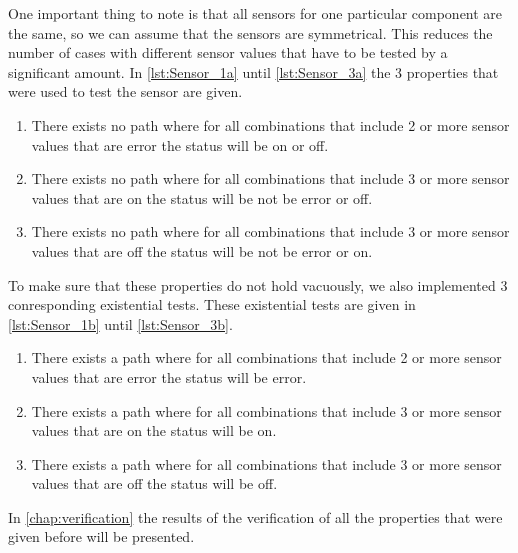 	One important thing to note is that all sensors for one particular component are the same, so we can assume that the sensors are symmetrical.
	This reduces the number of cases with different sensor values that have to be tested by a significant amount.
	In \cref{lst:Sensor_1a} until \cref{lst:Sensor_3a} the 3 properties that were used to test the sensor are given.
	
	\begin{enumerate}
		\item There exists no path where for all combinations that include 2 or more sensor values that are error the status will be on or off. 
		
			
		\item There exists no path where for all combinations that include 3 or more sensor values that are on the status will be not be error or off.
		
		
		\item There exists no path where for all combinations that include 3 or more sensor values that are off the status will be not be error or on.
		
	\end{enumerate}
	
	To make sure that these properties do not hold vacuously, we also implemented 3 conresponding existential tests.
	These existential tests are given in \cref{lst:Sensor_1b} until \cref{lst:Sensor_3b}.
	
	\begin{enumerate}
		\item There exists a path where for all combinations that include 2 or more sensor values that are error the status will be error. 
		
			
		\item There exists a path where for all combinations that include 3 or more sensor values that are on the status will be on. 
		
		
		\item There exists a path where for all combinations that include 3 or more sensor values that are off the status will be off. 
		
	\end{enumerate}
	
	
	In \cref{chap:verification} the results of the verification of all the properties that were given before will be presented.